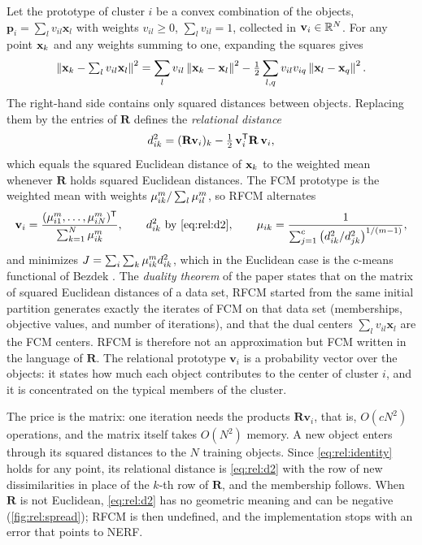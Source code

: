 Let the prototype of cluster $i$ be a convex combination of the objects, $\mathbf{p}_i=\sum_l v_{il}\mathbf{x}_l$ with weights $v_{il}\ge0$, $\sum_l v_{il}=1$, collected in $\mathbf{v}_i\in\mathbb{R}^N$. For any point $\mathbf{x}_k$ and any weights summing to one, expanding the squares gives
\begin{equation}
  \left\lVert \mathbf{x}_k-\textstyle\sum_l v_{il}\mathbf{x}_l \right\rVert^2
  =\sum_{l}v_{il}\left\lVert \mathbf{x}_k-\mathbf{x}_l \right\rVert^2-\tfrac12\sum_{l,q}v_{il}v_{iq}\left\lVert \mathbf{x}_l-\mathbf{x}_q \right\rVert^2 .
  \label{eq:rel:identity}
\end{equation}
The right-hand side contains only squared distances between objects. Replacing them by the entries of $\mathbf{R}$ defines the \emph{relational distance}
\begin{equation}
  d^2_{ik}=(\mathbf{R}\mathbf{v}_i)_k-\tfrac12\,\mathbf{v}_i^{\mathsf{T}}\mathbf{R}\,\mathbf{v}_i ,
  \label{eq:rel:d2}
\end{equation}
which equals the squared Euclidean distance of $\mathbf{x}_k$ to the weighted mean whenever $\mathbf{R}$ holds squared Euclidean distances. The FCM prototype is the weighted mean with weights $\mu_{ik}^m/\sum_l\mu_{il}^m$, so RFCM \cite{hathaway:1989:rfcm} alternates
\begin{equation}
  \mathbf{v}_i=\frac{(\mu_{i1}^m,\dots,\mu_{iN}^m)^{\mathsf{T}}}{\sum_{k=1}^{N}\mu_{ik}^m},\qquad
  d^2_{ik}\ \text{by \eqref{eq:rel:d2}},\qquad
  \mu_{ik}=\frac{1}{\sum_{j=1}^{c}\big(d^2_{ik}/d^2_{jk}\big)^{1/(m-1)}},
  \label{eq:rel:rfcm}
\end{equation}
and minimizes $J=\sum_i\sum_k\mu_{ik}^m d^2_{ik}$, which in the Euclidean case is the c-means functional of Bezdek \cite{bezdek:1981}. The \emph{duality theorem} of the paper states that on the matrix of squared Euclidean distances of a data set, RFCM started from the same initial partition generates exactly the iterates of FCM on that data set (memberships, objective values, and number of iterations), and that the dual centers $\sum_l v_{il}\mathbf{x}_l$ are the FCM centers. RFCM is therefore not an approximation but FCM written in the language of $\mathbf{R}$. The relational prototype $\mathbf{v}_i$ is a probability vector over the objects: it states how much each object contributes to the center of cluster $i$, and it is concentrated on the typical members of the cluster.

The price is the matrix: one iteration needs the products $\mathbf{R}\mathbf{v}_i$, that is, $O(cN^2)$ operations, and the matrix itself takes $O(N^2)$ memory. A new object enters through its squared distances to the $N$ training objects. Since \eqref{eq:rel:identity} holds for any point, its relational distance is \eqref{eq:rel:d2} with the row of new dissimilarities in place of the $k$-th row of $\mathbf{R}$, and the membership follows. When $\mathbf{R}$ is not Euclidean, \eqref{eq:rel:d2} has no geometric meaning and can be negative (\cref{fig:rel:spread}); RFCM is then undefined, and the implementation stops with an error that points to NERF.

